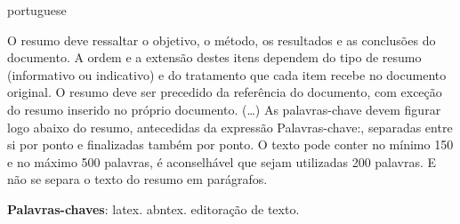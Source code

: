 \begin{resumo}[Resumo]
 \begin{otherlanguage*}{portuguese}

 O resumo deve ressaltar o objetivo, o método, os resultados e as conclusões
 do documento. A ordem e a extensão
 destes itens dependem do tipo de resumo (informativo ou indicativo) e do
 tratamento que cada item recebe no documento original. O resumo deve ser
 precedido da referência do documento, com exceção do resumo inserido no
 próprio documento. (\ldots) As palavras-chave devem figurar logo abaixo do
 resumo, antecedidas da expressão Palavras-chave:, separadas entre si por
 ponto e finalizadas também por ponto. O texto pode conter no mínimo 150 e
 no máximo 500 palavras, é aconselhável que sejam utilizadas 200 palavras.
 E não se separa o texto do resumo em parágrafos.

 \vspace{\onelineskip}

 \noindent
 \textbf{Palavras-chaves}: latex. abntex. editoração de texto.
 \end{otherlanguage*}
\end{resumo}
